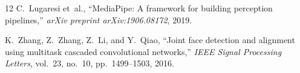 \documentclass[conference]{IEEEtran}
\begin{document}
\begin{thebibliography}{12}
C.~Lugaresi et~al.,
``MediaPipe: A framework for building perception pipelines,''
\emph{arXiv preprint arXiv:1906.08172}, 2019.

K.~Zhang, Z.~Zhang, Z.~Li, and Y.~Qiao,
``Joint face detection and alignment using multitask cascaded
convolutional networks,''
\emph{IEEE Signal Processing Letters},
vol.~23, no.~10, pp.~1499--1503, 2016.

\end{thebibliography}
\end{document}
